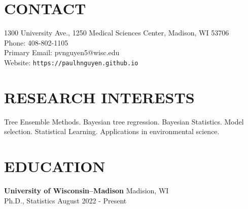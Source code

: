 \documentclass[margin]{res}
\begin{document}
  
                        
\begin{resume}                        
  
  \section{CONTACT} 
  1300 University Ave., 1250 Medical Sciences Center, Madison, WI 53706 \\
  Phone: 408-802-1105 \\ 
  Primary Email: pvnguyen5@wisc.edu \\
  Website: \texttt{https://paulhnguyen.github.io}

  \section{RESEARCH INTERESTS}
  Tree Ensemble Methods. Bayesian tree regression. Bayesian Statistics. Model selection. Statistical Learning. Applications in environmental science.
              


              
\section{EDUCATION}      
                {\bf University of Wisconsin--Madison} \hfill Madision, WI \\
                Ph.D., Statistics \hfill August 2022 - Present \\
                

\end{resume}
\end{document}
